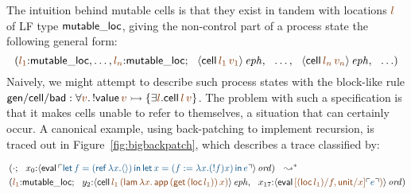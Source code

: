 The intuition behind mutable cells is that they exist in 
tandem with locations $\lf{l}$ of LF type ${\sf mutable\_loc}$,
giving the non-control part of a process state the following
general form:
\[\left(\lf{l_1}{:}{\sf mutable\_loc},\ldots,\lf{l_n}{:}{\sf mutable\_loc};
  ~~ \iseph{\susp{{\sf cell}\,\lf{l_1}\,\lf{v_1}}}, 
  ~~ \ldots, 
  ~~ \iseph{\susp{{\sf cell}\,\lf{l_n}\,\lf{v_n}}}, 
  ~~ \ldots\right)\]
%
Naively, we might attempt to describe such process 
states with the block-like rule 
${\sf gen/cell/bad} : \forall \lf{v}.\, {!}{\sf
  value}\,\lf{v} \lefti \{ \exists \lf{l}. {\sf cell}\,\lf{l}\,\lf{v}
\}$. The problem with such a specification is that it makes 
cells unable to refer to themselves, a situation that can certainly
occur. A canonical example, using back-patching to
implement recursion, is traced out 
in Figure~\ref{fig:bigbackpatch}, which
describes a trace classified by:

\vspace{-10pt}

{\small\begin{align*}
&
\left(\cdot; ~~
 x_0{:}\istrue{\susp{{\sf eval}\,
  \interp{{\sf let}\,f = ({\sf ref}\,\lambda x. \langle\rangle) \,{\sf in}\,
          {\sf let}\,x = (f := \lambda x. ({!}f) x)\,{\sf in}\,e}}}
\right) ~~ \leadsto^*
\\
& 
\left(
\lf{l_1}{:}{\sf mutable\_loc}; ~~
y_2{:}\iseph{\susp{{\sf cell}\,\lf{l_1}\,
  \lf{({\sf lam}\,\lambda x.\,{\sf app}\,({\sf get}\,({\sf loc}\,l_1))\,x)}}},
 ~~
x_{17}{:}\istrue{\susp{{\sf eval}\,
  \lf{[({\sf loc}\,l_1)/f, {\sf unit}/x]\interp{e})}}}
\right)
\end{align*}}

\vspace{-10pt}

